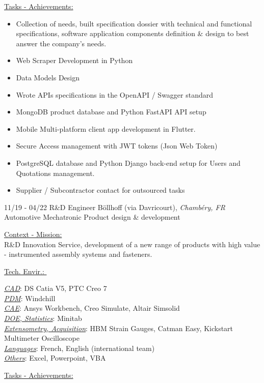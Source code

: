 \documentclass[]{friggeri-cv}
\begin{document}
\vspace{1.5mm}
\underline{Tasks - Achievements: }\\

\begin{itemize}
\setlength{\itemsep}{1pt}
\setlength{\parskip}{0pt}
\setlength{\parsep}{0pt}

\item Collection of needs, built specification dossier with technical and functional specifications, software application components definition \& design to best answer the company's needs.
\item Web Scraper Development in Python
\item Data Models Design
\item Wrote APIs specifications in the OpenAPI / Swagger standard
\item MongoDB product database and Python FastAPI API setup
\item Mobile Multi-platform client app development in Flutter.
\item Secure Access management with JWT tokens (Json Web Token)
\item PostgreSQL database and Python Django back-end setup for Users and Quotations management.
\item Supplier / Subcontractor contact for outsourced tasks
\end{itemize}

\begin{entrylist}
  \entry
    {11/19 - 04/22}
    {R\&D Engineer}
    {Böllhoff (via Davricourt), \textit{Chambéry, FR}}
    {Automotive Mechatronic Product design \& development}
\end{entrylist}
\vspace{-10pt}
\begin{minipage}[t]{0.65\linewidth}
\underline{Context - Mission: }\\
R\&D Innovation Service, development of a new range of products with high value - instrumented assembly systems and fasteners.\\
\end{minipage} %
\begin{minipage}[t]{0.38\textwidth}
    \underline{Tech. Envir.: }\
    \vspace{1mm}
    
\underline{\textit{CAD}}: DS Catia V5, PTC Creo 7\\
\underline{\textit{PDM}}: Windchill\\
\underline{\textit{CAE}}: Ansys Workbench, Creo Simulate, Altair Simsolid\\
\underline{\textit{DOE, Statistics}}: Minitab\\
\underline{\textit{Extensometry, Acquisition}}: HBM Strain Gauges, Catman Easy, Kickstart Multimeter Oscilloscope\\
\underline{\textit{Languages}}: French, English (international team)\\
\underline{\textit{Others}}: Excel, Powerpoint, VBA
    \end{minipage}
\vspace{1.5mm}
\underline{Tasks - Achievements: }\\
\end{document}
